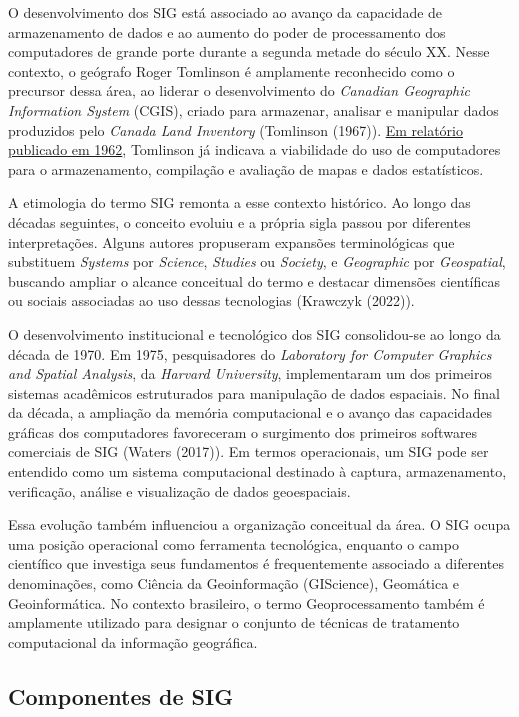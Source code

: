 \documentclass[
  letterpaper,
  DIV=11,
  numbers=noendperiod]{scrreprt}
\begin{document}
O desenvolvimento dos SIG está associado ao avanço da capacidade de
armazenamento de dados e ao aumento do poder de processamento dos
computadores de grande porte durante a segunda metade do século XX.
Nesse contexto, o geógrafo Roger Tomlinson é amplamente reconhecido como
o precursor dessa área, ao liderar o desenvolvimento do \emph{Canadian
Geographic Information System} (CGIS), criado para armazenar, analisar e
manipular dados produzidos pelo \emph{Canada Land Inventory} (Tomlinson
(1967)).
\href{https://gisandscience.wordpress.com/wp-content/uploads/2012/08/4-computermapping.pdf}{Em
relatório publicado em 1962}, Tomlinson já indicava a viabilidade do uso
de computadores para o armazenamento, compilação e avaliação de mapas e
dados estatísticos.

A etimologia do termo SIG remonta a esse contexto histórico. Ao longo
das décadas seguintes, o conceito evoluiu e a própria sigla passou por
diferentes interpretações. Alguns autores propuseram expansões
terminológicas que substituem \emph{Systems} por \emph{Science},
\emph{Studies} ou \emph{Society}, e \emph{Geographic} por
\emph{Geospatial}, buscando ampliar o alcance conceitual do termo e
destacar dimensões científicas ou sociais associadas ao uso dessas
tecnologias (Krawczyk (2022)).

O desenvolvimento institucional e tecnológico dos SIG consolidou-se ao
longo da década de 1970. Em 1975, pesquisadores do \emph{Laboratory for
Computer Graphics and Spatial Analysis}, da \emph{Harvard University},
implementaram um dos primeiros sistemas acadêmicos estruturados para
manipulação de dados espaciais. No final da década, a ampliação da
memória computacional e o avanço das capacidades gráficas dos
computadores favoreceram o surgimento dos primeiros softwares comerciais
de SIG (Waters (2017)). Em termos operacionais, um SIG pode ser
entendido como um sistema computacional destinado à captura,
armazenamento, verificação, análise e visualização de dados
geoespaciais.

Essa evolução também influenciou a organização conceitual da área. O SIG
ocupa uma posição operacional como ferramenta tecnológica, enquanto o
campo científico que investiga seus fundamentos é frequentemente
associado a diferentes denominações, como Ciência da Geoinformação
(GIScience), Geomática e Geoinformática. No contexto brasileiro, o termo
Geoprocessamento também é amplamente utilizado para designar o conjunto
de técnicas de tratamento computacional da informação geográfica.

\subsection{Componentes de SIG}\label{componentes-de-sig}
\end{document}
